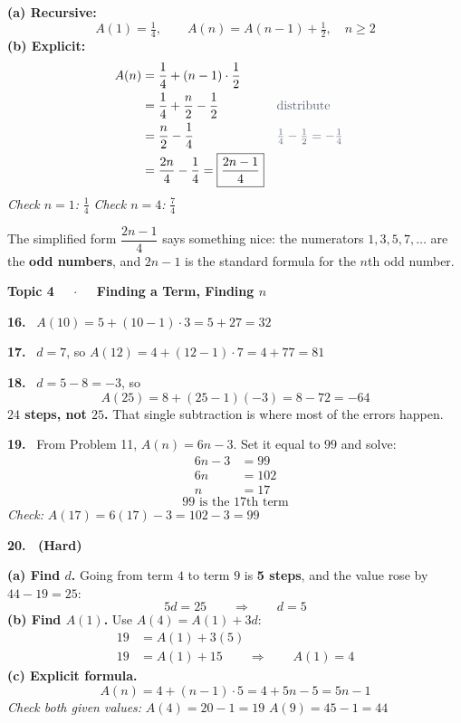\documentclass[11pt]{article}
\newcommand{\ans}[1]{\boxed{#1}}
\newcommand{\vans}[1]{\textbf{\textcolor{ink}{#1}}}
\newcommand{\rsn}[1]{\textcolor{slate}{\text{#1}}}
\newcommand{\keyhead}[1]{%
  \par\vspace{9pt}\noindent
  \begin{tcolorbox}[colback=violet!12,colframe=violet,arc=2pt,boxrule=0pt,
    leftrule=3.2pt,left=8pt,right=8pt,top=3pt,bottom=3pt]
  {\color{violet}\bfseries #1}
  \end{tcolorbox}\par\vspace{2pt}}
\begin{document}
\vspace{2pt}
\textbf{(a) Recursive:}
\[
\ans{A(1)=\tfrac14, \qquad A(n)=A(n-1)+\tfrac12, \quad n\ge2}
\]
\textbf{(b) Explicit:}
\begin{align*}
A(n) &= \frac14+(n-1)\cdot\frac12\\
&= \frac14+\frac{n}{2}-\frac12 && \rsn{distribute}\\
&= \frac{n}{2}-\frac14 && \rsn{$\tfrac14-\tfrac12=-\tfrac14$}\\
&= \frac{2n}{4}-\frac{1}{4} = \ans{\frac{2n-1}{4}}
\end{align*}
\emph{Check $n=1$:} $\tfrac{1}{4}$  \quad \emph{Check $n=4$:} $\tfrac{7}{4}$ 

\begin{notebox}
The simplified form $\dfrac{2n-1}{4}$ says something nice: the numerators
$1,3,5,7,\ldots$ are the \textbf{odd numbers}, and $2n-1$ is the standard formula for the $n$th
odd number.
\end{notebox}

\keyhead{Topic 4 \ \ $\cdot$ \ \ Finding a Term, Finding $n$}

\textbf{16.} \ $A(10)=5+(10-1)\cdot3=5+27=\ans{32}$

\vspace{3pt}
\textbf{17.} \ $d=7$, so $A(12)=4+(12-1)\cdot7=4+77=\ans{81}$

\vspace{3pt}
\textbf{18.} \ $d=5-8=-3$, so
\[
A(25)=8+(25-1)(-3)=8-72=\ans{-64}
\]
\vans{$24$ steps, not $25$.} That single subtraction is where most of the errors happen.

\vspace{4pt}
\textbf{19.} \ From Problem 11, $A(n)=6n-3$. Set it equal to $99$ and solve:
\begin{align*}
6n-3 &= 99\\
6n &= 102\\
n &= 17
\end{align*}
\[
\ans{99 \text{ is the } 17\text{th term}}
\]
\emph{Check:} $A(17)=6(17)-3=102-3=99$ 

\vspace{4pt}
\textbf{20. \ (Hard)}

\vspace{2pt}
\textbf{(a) Find $d$.} Going from term $4$ to term $9$ is \textbf{5 steps}, and the value rose by
$44-19=25$:
\[
5d=25 \qquad\Longrightarrow\qquad \ans{d=5}
\]
\textbf{(b) Find $A(1)$.} Use $A(4)=A(1)+3d$:
\begin{align*}
19 &= A(1)+3(5)\\
19 &= A(1)+15 \qquad\Longrightarrow\qquad \ans{A(1)=4}
\end{align*}
\textbf{(c) Explicit formula.}
\[
A(n)=4+(n-1)\cdot5=4+5n-5=\ans{5n-1}
\]
\emph{Check both given values:} $A(4)=20-1=19$  \quad $A(9)=45-1=44$ 
\end{document}
